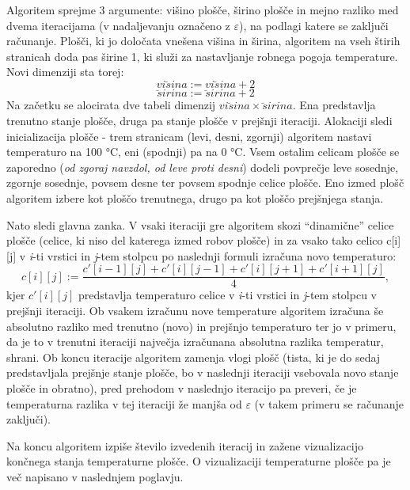 \documentclass[a4paper,titlepage,11pt]{article}
\begin{document}
Algoritem sprejme 3 argumente: višino plošče, širino plošče in mejno razliko med dvema iteracijama (v nadaljevanju označeno z \(\varepsilon\)), na podlagi katere se zaključi računanje. Plošči, ki jo določata vnešena višina in širina, algoritem na vseh štirih stranicah doda pas širine 1, ki služi za nastavljanje robnega pogoja temperature. Novi dimenziji sta torej:
\begin{equation}
vi\breve{s}ina := vi\breve{s}ina + 2
\end{equation}
\begin{equation}
\breve{s}irina := \breve{s}irina + 2
\end{equation}
Na začetku se alocirata dve tabeli dimenzij $ vi\breve{s}ina \times \breve{s}irina$. Ena predstavlja trenutno stanje plošče, druga pa stanje plošče v prejšnji iteraciji. Alokaciji sledi inicializacija plošče - trem stranicam (levi, desni, zgornji) algoritem nastavi temperaturo na 100 °C, eni (spodnji) pa na 0 °C. Vsem ostalim celicam plošče se zaporedno (\textit{od zgoraj navzdol, od leve proti desni}) dodeli povprečje leve sosednje, zgornje sosednje, povsem desne ter povsem spodnje celice plošče. Eno izmed plošč algoritem izbere kot ploščo trenutnega, drugo pa kot ploščo prejšnjega stanja.
\indent \par Nato sledi glavna zanka. V vsaki iteraciji gre algoritem skozi ``dinamične'' celice plošče (celice, ki niso del katerega izmed robov plošče) in za vsako tako celico c[i][j] v \textit{i}-ti vrstici in \textit{j}-tem stolpcu po naslednji formuli izračuna novo temperaturo:
\begin{equation}
c[i][j] := \frac{c'[i - 1][j] + c'[i][j - 1] + c'[i][j + 1] + c'[i + 1][j]}{4},
\end{equation}
kjer $c'[i][j]$ predstavlja temperaturo celice v \textit{i}-ti vrstici in \textit{j}-tem stolpcu v prejšnji iteraciji. Ob vsakem izračunu nove temperature algoritem izračuna še absolutno razliko med trenutno (novo) in prejšnjo temperaturo ter jo v primeru, da je to v trenutni iteraciji največja izračunana absolutna razlika temperatur, shrani. Ob koncu iteracije algoritem zamenja vlogi plošč (tista, ki je do sedaj predstavljala prejšnje stanje plošče, bo v naslednji iteraciji vsebovala novo stanje plošče in obratno), pred prehodom v naslednjo iteracijo pa preveri, če je temperaturna razlika v tej iteraciji že manjša od \(\varepsilon\) (v takem primeru se računanje zaključi).

Na koncu algoritem izpiše število izvedenih iteracij in zažene vizualizacijo končnega stanja temperaturne plošče. O vizualizaciji temperaturne plošče pa je več napisano v naslednjem poglavju.
\end{document}
